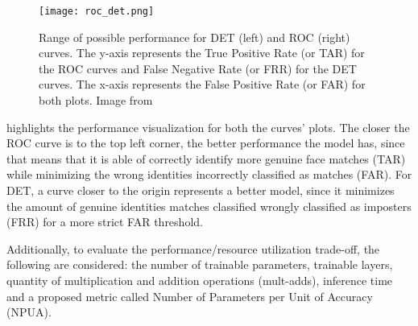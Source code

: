 \documentclass[class=report, crop=false, a4paper, 12pt]{standalone}
\begin{document}

\begin{figure}[H]
  \centering
  \texttt{[image: roc\_det.png]}
  \caption[Range of possible performance for DET and ROC curves .]{Range of possible performance for DET (left) and ROC (right) curves. The y-axis represents the True Positive Rate (or TAR) for the ROC curves and False Negative Rate (or FRR) for the DET curves. The x-axis represents the False Positive Rate (or FAR) for both plots. Image from~\autocite{saenz-lechonMethodologicalIssuesDevelopment2006}}
  \label{fig:roc_curve}
\end{figure}

\par {} highlights the performance visualization for both the curves' plots. The closer the ROC curve is to the top left corner, the better performance the model has, since that means that it is able of correctly identify more genuine face matches (TAR) while minimizing the wrong identities incorrectly classified as matches (FAR). For DET, a curve closer to the origin represents a better model, since it minimizes the amount of genuine identities matches classified wrongly classified as imposters (FRR) for a more strict FAR threshold.
\par Additionally, to evaluate the performance/resource utilization trade-off, the following are considered: the number of trainable parameters, trainable layers, quantity of multiplication and addition operations (mult-adds), inference time and a proposed metric called Number of Parameters per Unit of Accuracy (NPUA). 
\end{document}
